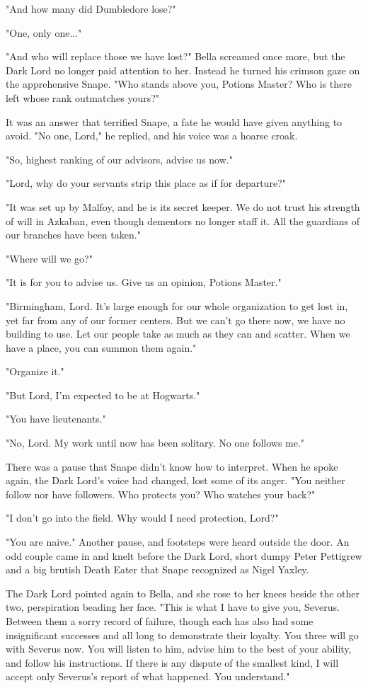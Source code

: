 "And how many did Dumbledore lose?"

"One, only one..."

"And who will replace those we have lost?" Bella screamed once more, but the Dark Lord no longer paid attention to her. Instead he turned his crimson gaze on the apprehensive Snape. "Who stands above you, Potions Master? Who is there left whose rank outmatches yours?"

It was an answer that terrified Snape, a fate he would have given anything to avoid. "No one, Lord," he replied, and his voice was a hoarse croak.

"So, highest ranking of our advisors, advise us now."

"Lord, why do your servants strip this place as if for departure?"

"It was set up by Malfoy, and he is its secret keeper. We do not trust his strength of will in Azkaban, even though dementors no longer staff it. All the guardians of our branches have been taken."

"Where will we go?"

"It is for you to advise us. Give us an opinion, Potions Master."

"Birmingham, Lord. It's large enough for our whole organization to get lost in, yet far from any of our former centers. But we can't go there now, we have no building to use. Let our people take as much as they can and scatter. When we have a place, you can summon them again."

"Organize it."

"But Lord, I'm expected to be at Hogwarts."

"You have lieutenants."

"No, Lord. My work until now has been solitary. No one follows me."

There was a pause that Snape didn't know how to interpret. When he spoke again, the Dark Lord's voice had changed, lost some of its anger. "You neither follow nor have followers. Who protects you? Who watches your back?"

"I don't go into the field. Why would I need protection, Lord?"

"You are naive." Another pause, and footsteps were heard outside the door. An odd couple came in and knelt before the Dark Lord, short dumpy Peter Pettigrew and a big brutish Death Eater that Snape recognized as Nigel Yaxley.

The Dark Lord pointed again to Bella, and she rose to her knees beside the other two, perspiration beading her face. "This is what I have to give you, Severus. Between them a sorry record of failure, though each has also had some insignificant successes and all long to demonstrate their loyalty. You three will go with Severus now. You will listen to him, advise him to the best of your ability, and follow his instructions. If there is any dispute of the smallest kind, I will accept only Severus's report of what happened. You understand."

